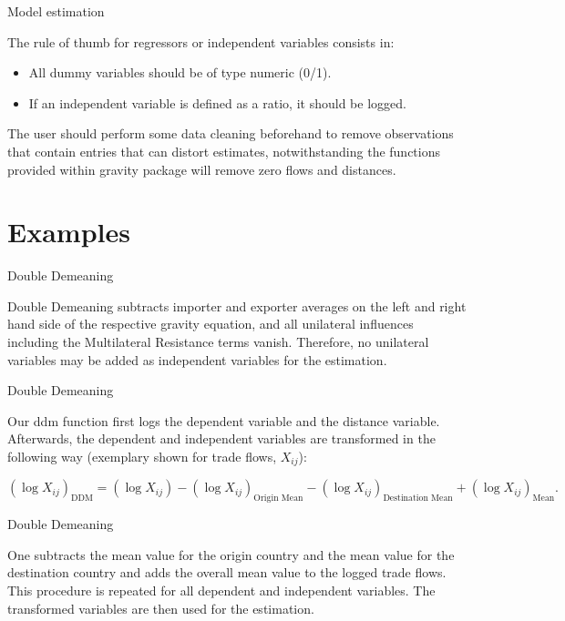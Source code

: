 \documentclass[ignorenonframetext,compress,aspectratio=169]{beamer}
\providecommand{\tightlist}{%
  \setlength{\itemsep}{0pt}\setlength{\parskip}{0pt}}
\begin{document}
\begin{frame}{Model estimation}

The rule of thumb for regressors or independent variables consists in:

\begin{itemize}
\tightlist
\item
  All dummy variables should be of type numeric (0/1).
\item
  If an independent variable is defined as a ratio, it should be logged.
\end{itemize}

The user should perform some data cleaning beforehand to remove
observations that contain entries that can distort estimates,
notwithstanding the functions provided within gravity package will
remove zero flows and distances.

\end{frame}

\section{Examples}\label{examples}

\begin{frame}{Double Demeaning}

Double Demeaning subtracts importer and exporter averages on the left
and right hand side of the respective gravity equation, and all
unilateral influences including the Multilateral Resistance terms
vanish. Therefore, no unilateral variables may be added as independent
variables for the estimation.

\end{frame}

\begin{frame}{Double Demeaning}

Our ddm function first logs the dependent variable and the distance
variable. Afterwards, the dependent and independent variables are
transformed in the following way (exemplary shown for trade flows,
\(X_{ij}\)):

\[
(\log X_{ij})_{\text{DDM}} = (\log X_{ij}) - (\log X_{ij})_{\text{Origin Mean}} - (\log X_{ij})_{\text{Destination Mean}} + (\log X_{ij})_{\text{Mean}}.
\]

\end{frame}

\begin{frame}{Double Demeaning}

One subtracts the mean value for the origin country and the mean value
for the destination country and adds the overall mean value to the
logged trade flows. This procedure is repeated for all dependent and
independent variables. The transformed variables are then used for the
estimation.

\end{frame}
\end{document}

